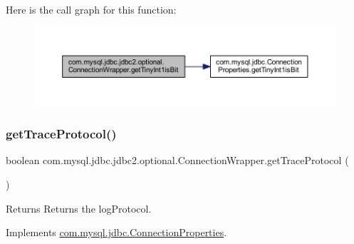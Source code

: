 Here is the call graph for this function\+:
\nopagebreak
\begin{figure}[H]
\begin{center}
\leavevmode
\includegraphics[width=350pt]{classcom_1_1mysql_1_1jdbc_1_1jdbc2_1_1optional_1_1_connection_wrapper_a0c0c590343b7fce7d02e4293a92d4cb8_cgraph}
\end{center}
\end{figure}
\mbox{\label{classcom_1_1mysql_1_1jdbc_1_1jdbc2_1_1optional_1_1_connection_wrapper_a06d5bb90a0cf97abeb4975e63d92ea7a}} 
\subsubsection{\texorpdfstring{get\+Trace\+Protocol()}{getTraceProtocol()}}
{\footnotesize\ttfamily boolean com.\+mysql.\+jdbc.\+jdbc2.\+optional.\+Connection\+Wrapper.\+get\+Trace\+Protocol (\begin{DoxyParamCaption}{ }\end{DoxyParamCaption})}

\begin{DoxyReturn}{Returns}
Returns the log\+Protocol. 
\end{DoxyReturn}


Implements \mbox{\hyperlink{interfacecom_1_1mysql_1_1jdbc_1_1_connection_properties_ac91e629cc7505335e1de76be5d070102}{com.\+mysql.\+jdbc.\+Connection\+Properties}}.

